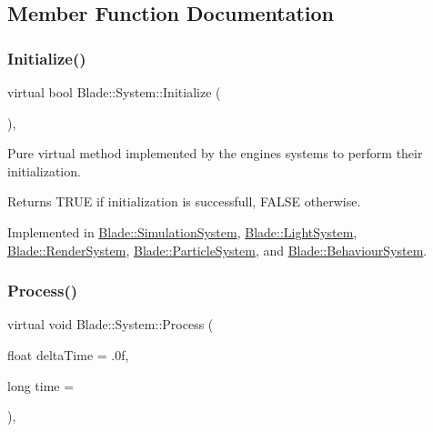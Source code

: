 \subsection{Member Function Documentation}
\mbox{\label{class_blade_1_1_system_a63fa00af40dc54d093300eff4785f26f}} 
\subsubsection{\texorpdfstring{Initialize()}{Initialize()}}
{\footnotesize\ttfamily virtual bool Blade\+::\+System\+::\+Initialize (\begin{DoxyParamCaption}{ }\end{DoxyParamCaption})\hspace{0.3cm}{\ttfamily [pure virtual]}, {\ttfamily [noexcept]}}



Pure virtual method implemented by the engine\textquotesingle{}s systems to perform their initialization. 

\begin{DoxyReturn}{Returns}
T\+R\+UE if initialization is successfull, F\+A\+L\+SE otherwise. 
\end{DoxyReturn}


Implemented in \hyperlink{class_blade_1_1_simulation_system_a44ca3c7941497162d70f1e9e53b016f9}{Blade\+::\+Simulation\+System}, \hyperlink{class_blade_1_1_light_system_af87b68ecd946b49576a17e59bfc88934}{Blade\+::\+Light\+System}, \hyperlink{class_blade_1_1_render_system_a476d3d55dcc9f65e8a88096aace6dcfc}{Blade\+::\+Render\+System}, \hyperlink{class_blade_1_1_particle_system_ae409003e325c44d82a3dcd1794ffb77d}{Blade\+::\+Particle\+System}, and \hyperlink{class_blade_1_1_behaviour_system_ac4d601f2f88faf7deceb78e01ca8d6be}{Blade\+::\+Behaviour\+System}.

\mbox{\label{class_blade_1_1_system_a80c186f5f9f8fa4fd317b861853fe6a8}} 
\subsubsection{\texorpdfstring{Process()}{Process()}}
{\footnotesize\ttfamily virtual void Blade\+::\+System\+::\+Process (\begin{DoxyParamCaption}\item[{float}]{delta\+Time = {\ttfamily .0f},  }\item[{long}]{time = {} }\end{DoxyParamCaption})\hspace{0.3cm}{\ttfamily [pure virtual]}, {\ttfamily [noexcept]}}



